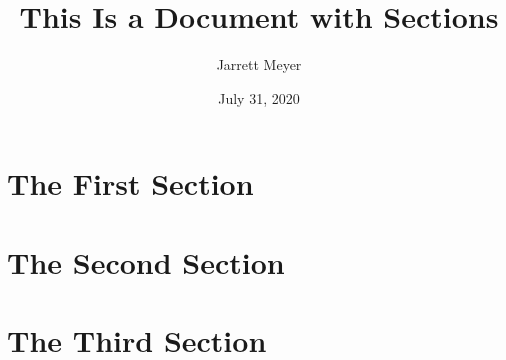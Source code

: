 \documentclass[12pt, letterpaper]{article}
\title{This Is a Document with Sections}
\author{Jarrett Meyer}
\date{July 31, 2020}
\begin{document}
\maketitle

\tableofcontents

\section{The First Section}
\lipsum

\section{The Second Section}
\lipsum

\section{The Third Section}
\lipsum
\end{document}
